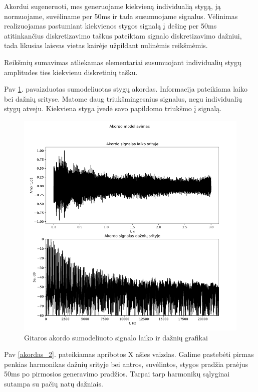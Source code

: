 \documentclass[10pt,a4paper,twocolumn]{article}
\begin{document}
Akordui sugeneruoti, mes generuojame kiekvieną individualią stygą, ją normuojame, suvėliname per 50ms ir tada susumuojame signalus. Vėlinimas realizuojamas pastumiant kiekvienos stygos signalą į dešinę per 50ms atitinkančius diskretizavimo taškus pateiktam signalo diskretizavimo dažniui, tada likusias laisvas vietas kairėje užpildant nulinėmis reikšmėmis.

Reikšmių sumavimas atliekamas elementariai susumuojant individualių stygų amplitudes ties kiekvienu diskretinių tašku.

Pav \ref{akordas_1}. pavaizduotas sumodeliuotas stygų akordas. Informacija pateikiama laiko bei dažnių srityse. Matome daug triukšmingesnius signalus, negu individualių stygų atveju. Kiekviena styga įvedė savo papildomo triukšmo į signalą.

\begin{figure} %
	[!h]
	\centering
	\includegraphics*[width=.9\columnwidth]{akordas_1.png} %
	\caption{Gitaros akordo sumodeliuoto signalo laiko ir dažnių grafikai}
	\label{akordas_1}
	\vspace{6pt}
\end{figure}

Pav \ref{akordas_2}. pateikiamas apribotos X ašies vaizdas. Galime pastebėti pirmas penkias harmonikas dažnių srityje bei antros, suvėlintos, stygos pradžia praėjus 50ms po pirmosios generavimo pradžios. Tarpai tarp harmonikų sąlyginai sutampa su pačių natų dažniais.
\end{document}
